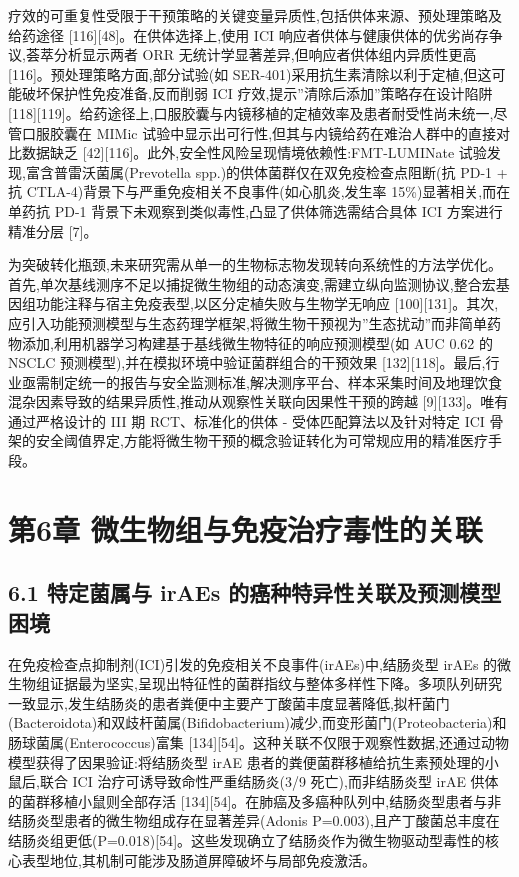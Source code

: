 \documentclass[11pt]{article}
\begin{document}
疗效的可重复性受限于干预策略的关键变量异质性,包括供体来源、预处理策略及给药途径 {[}116{]}{[}48{]}。在供体选择上,使用 ICI 响应者供体与健康供体的优劣尚存争议,荟萃分析显示两者 ORR 无统计学显著差异,但响应者供体组内异质性更高 {[}116{]}。预处理策略方面,部分试验(如 SER-401)采用抗生素清除以利于定植,但这可能破坏保护性免疫准备,反而削弱 ICI 疗效,提示''清除后添加''策略存在设计陷阱 {[}118{]}{[}119{]}。给药途径上,口服胶囊与内镜移植的定植效率及患者耐受性尚未统一,尽管口服胶囊在 MIMic 试验中显示出可行性,但其与内镜给药在难治人群中的直接对比数据缺乏 {[}42{]}{[}116{]}。此外,安全性风险呈现情境依赖性:FMT-LUMINate 试验发现,富含普雷沃菌属(Prevotella spp.)的供体菌群仅在双免疫检查点阻断(抗 PD-1 + 抗 CTLA-4)背景下与严重免疫相关不良事件(如心肌炎,发生率 15\%)显著相关,而在单药抗 PD-1 背景下未观察到类似毒性,凸显了供体筛选需结合具体 ICI 方案进行精准分层 {[}7{]}。

为突破转化瓶颈,未来研究需从单一的生物标志物发现转向系统性的方法学优化。首先,单次基线测序不足以捕捉微生物组的动态演变,需建立纵向监测协议,整合宏基因组功能注释与宿主免疫表型,以区分定植失败与生物学无响应 {[}100{]}{[}131{]}。其次,应引入功能预测模型与生态药理学框架,将微生物干预视为''生态扰动''而非简单药物添加,利用机器学习构建基于基线微生物特征的响应预测模型(如 AUC 0.62 的 NSCLC 预测模型),并在模拟环境中验证菌群组合的干预效果 {[}132{]}{[}118{]}。最后,行业亟需制定统一的报告与安全监测标准,解决测序平台、样本采集时间及地理饮食混杂因素导致的结果异质性,推动从观察性关联向因果性干预的跨越 {[}9{]}{[}133{]}。唯有通过严格设计的 III 期 RCT、标准化的供体 - 受体匹配算法以及针对特定 ICI 骨架的安全阈值界定,方能将微生物干预的概念验证转化为可常规应用的精准医疗手段。

\section{第6章 微生物组与免疫治疗毒性的关联}\label{ux7b2c6ux7ae0-ux5faeux751fux7269ux7ec4ux4e0eux514dux75abux6cbbux7597ux6bd2ux6027ux7684ux5173ux8054}

\subsection{6.1 特定菌属与 irAEs 的癌种特异性关联及预测模型困境}\label{ux7279ux5b9aux83ccux5c5eux4e0e-iraes-ux7684ux764cux79cdux7279ux5f02ux6027ux5173ux8054ux53caux9884ux6d4bux6a21ux578bux56f0ux5883}

在免疫检查点抑制剂(ICI)引发的免疫相关不良事件(irAEs)中,结肠炎型 irAEs 的微生物组证据最为坚实,呈现出特征性的菌群指纹与整体多样性下降。多项队列研究一致显示,发生结肠炎的患者粪便中主要产丁酸菌丰度显著降低,拟杆菌门(Bacteroidota)和双歧杆菌属(Bifidobacterium)减少,而变形菌门(Proteobacteria)和肠球菌属(Enterococcus)富集 {[}134{]}{[}54{]}。这种关联不仅限于观察性数据,还通过动物模型获得了因果验证:将结肠炎型 irAE 患者的粪便菌群移植给抗生素预处理的小鼠后,联合 ICI 治疗可诱导致命性严重结肠炎(3/9 死亡),而非结肠炎型 irAE 供体的菌群移植小鼠则全部存活 {[}134{]}{[}54{]}。在肺癌及多癌种队列中,结肠炎型患者与非结肠炎型患者的微生物组成存在显著差异(Adonis P=0.003),且产丁酸菌总丰度在结肠炎组更低(P=0.018){[}54{]}。这些发现确立了结肠炎作为微生物驱动型毒性的核心表型地位,其机制可能涉及肠道屏障破坏与局部免疫激活。
\end{document}
